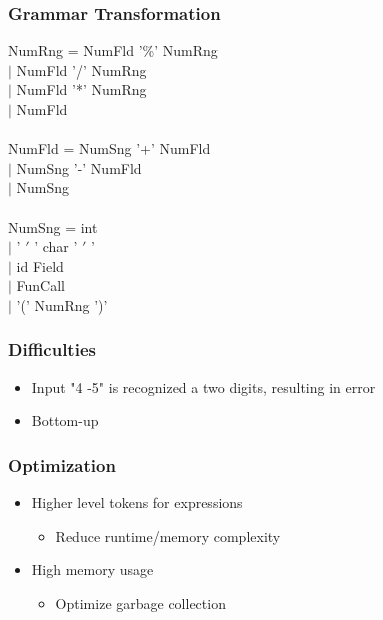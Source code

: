 \documentclass{beamer}
\begin{document}
\begin{frame}
\frametitle{Grammar Transformation}
NumRng = NumFld '\%' NumRng\\
$|$ NumFld '/' NumRng\\
$|$ NumFld '*' NumRng\\
$|$ NumFld\\
\quad\\
NumFld = NumSng '+' NumFld\\
$|$ NumSng '-' NumFld\\
$|$ NumSng\\
\quad\\
NumSng = int\\
$|$ ' $'$ ' char ' $'$ '\\
$|$ id Field\\
$|$ FunCall\\
$|$ '(' NumRng ')'\\
\end{frame}

\begin{frame}
\frametitle{Difficulties}
\begin{itemize}
\item Input "4 -5" is recognized a two digits, resulting in error
\item Bottom-up
\end{itemize}
\end{frame}

\begin{frame}
\frametitle{Optimization}
\begin{itemize}
\item Higher level tokens for expressions
\begin{itemize}
\item Reduce runtime/memory complexity
\end{itemize}
\item High memory usage
\begin{itemize}
\item Optimize garbage collection
\end{itemize}
\end{itemize}
\end{frame}

\begin{frame}
\end{frame}
\end{document}
